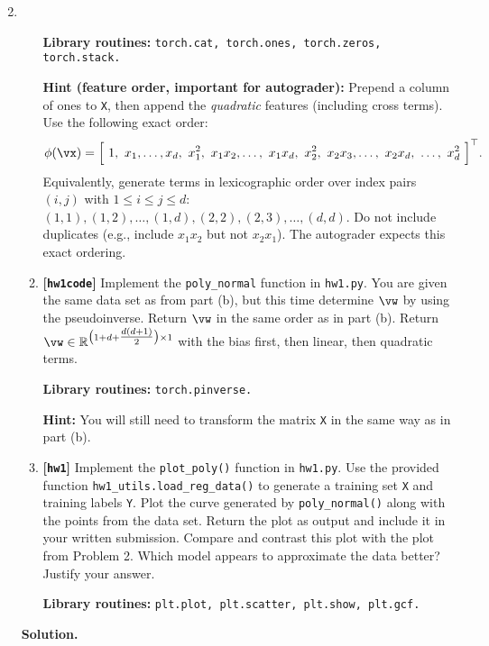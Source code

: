 \documentclass{article}
\def\R{\mathbb{R}}
\def\hw{\textbf{[\texttt{hw1}]}\xspace}
\def\hwcode{\textbf{[\texttt{hw1code}]}\xspace}
\theoremstyle{definition}
\theoremstyle{remark}
\newenvironment{Q}
{%
  \clearpage
  \item
  }
  {%
    \phantom{s} %
    \bigskip
    \textbf{Solution.}
  }
\begin{document}
\begin{enumerate}[font={\Large\bfseries},left=0pt]
\begin{Q}
\begin{enumerate}
 \textbf{Library routines:} \texttt{torch.cat, torch.ones, torch.zeros, torch.stack.}
  
 \textbf{Hint (feature order, important for autograder):} Prepend a column of ones to \texttt{X}, then append the \emph{quadratic} features (including cross terms). Use the following exact order:
 $$\phi(\vx) = \Big[\ 1,\ x_1,\ldots,x_d,\ x_1^2,\ x_1x_2,\ldots,\ x_1x_d,\ x_2^2,\ x_2x_3,\ldots,\ x_2x_d,\ \ldots,\ x_d^2\ \Big]^\top.$$
 Equivalently, generate terms in lexicographic order over index pairs $(i,j)$ with $1\le i\le j\le d$: $(1,1), (1,2),\ldots,(1,d),(2,2),(2,3),\ldots,(d,d)$. Do not include duplicates (e.g., include $x_1x_2$ but not $x_2x_1$). The autograder expects this exact ordering.
  
 \item \hwcode Implement the \texttt{poly\_normal} function in \texttt{hw1.py}.  You are given the same data set as from part (b), but this time determine $\vw$ by using the pseudoinverse.  Return $\vw$ in the same order as in part (b). Return $\vw \in \R^{\bigl(1 + d + \tfrac{d(d+1)}{2}\bigr)\times 1}$ with the bias first, then linear, then quadratic terms.
  
  \textbf{Library routines:} \texttt{torch.pinverse.}
  
  \textbf{Hint:} You will still need to transform the matrix \texttt{X} in the same way as in part (b).
  
 \item \hw Implement the \texttt{plot\_poly()} function in \texttt{hw1.py}.  Use the provided function \texttt{hw1\_utils.load\_reg\_data()} to generate a training set \texttt{X} and training labels \texttt{Y}. Plot the curve generated by \texttt{poly\_normal()} along with the points from the data set.  Return the plot as output and include it in your written submission.  Compare and contrast this plot with the plot from Problem 2.  Which model appears to approximate the data better? Justify your answer.
  
  \textbf{Library routines:} \texttt{plt.plot, plt.scatter, plt.show, plt.gcf.}
  

\end{enumerate}
\end{Q}
\end{enumerate}
\end{document}
